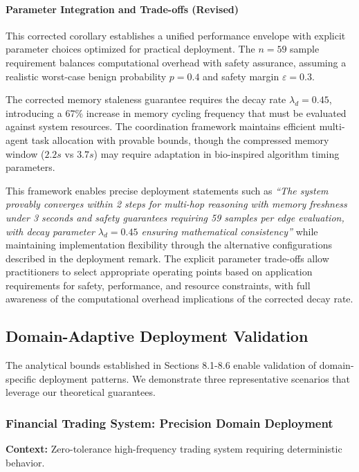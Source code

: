 \documentclass{article}
\begin{document}
\paragraph{Parameter Integration and Trade-offs (Revised)} This corrected corollary establishes a unified performance envelope with explicit parameter choices optimized for practical deployment. The $n = 59$ sample requirement balances computational overhead with safety assurance, assuming a realistic worst-case benign probability $p = 0.4$ and safety margin $\varepsilon = 0.3$. 

The corrected memory staleness guarantee requires the decay rate $\lambda_d = 0.45$, introducing a 67\% increase in memory cycling frequency that must be evaluated against system resources. The coordination framework maintains efficient multi-agent task allocation with provable bounds, though the compressed memory window ($2.2s$ vs $3.7s$) may require adaptation in bio-inspired algorithm timing parameters.

This framework enables precise deployment statements such as \emph{``The system provably converges within 2 steps for multi-hop reasoning with memory freshness under 3 seconds and safety guarantees requiring 59 samples per edge evaluation, with decay parameter $\lambda_d = 0.45$ ensuring mathematical consistency''} while maintaining implementation flexibility through the alternative configurations described in the deployment remark. The explicit parameter trade-offs allow practitioners to select appropriate operating points based on application requirements for safety, performance, and resource constraints, with full awareness of the computational overhead implications of the corrected decay rate.

\subsection{Domain-Adaptive Deployment Validation}
\label{sec:domain_deployment_validation}

The analytical bounds established in Sections 8.1-8.6 enable validation of domain-specific deployment patterns. We demonstrate three representative scenarios that leverage our theoretical guarantees.

\subsubsection{Financial Trading System: Precision Domain Deployment}

\textbf{Context:} Zero-tolerance high-frequency trading system requiring deterministic behavior.
\end{document}
